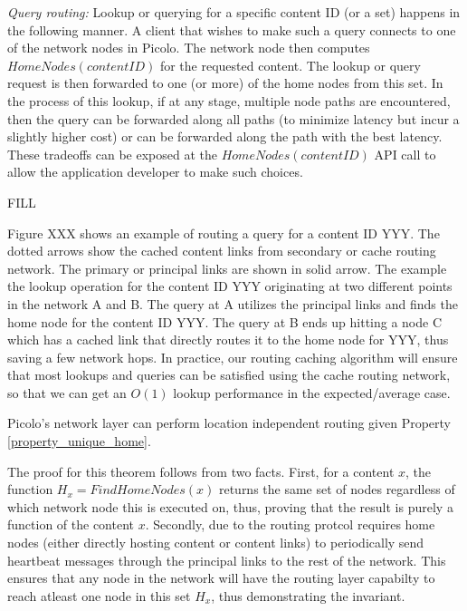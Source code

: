 {\em Query routing:} Lookup or querying for a specific content ID (or a set) happens in the following manner. A client
that wishes to make such a query connects to one of the network nodes in Picolo. The network node then computes
\(HomeNodes(contentID)\) for the requested content. The lookup or query request is then forwarded to one (or more)
of the home nodes from this set. In the process of this lookup, if at any stage, multiple node paths are encountered,
then the query can be forwarded along all paths (to minimize latency but incur a slightly higher cost) or can be
forwarded along the path with the best latency. These tradeoffs can be exposed at the \(HomeNodes(contentID)\) API
call to allow the application developer to make such choices.

FILL

Figure XXX shows an example of routing a query for a content ID YYY. The dotted arrows show the cached content links from
secondary or cache routing network. The primary or principal links are shown in solid arrow. The example the lookup operation
for the content ID YYY originating at two different points in the network A and B. The query at A utilizes the principal
links and finds the home node for the content ID YYY. The query at B ends up hitting a node C which has a cached link that
directly routes it to the home node for YYY, thus saving a few network hops. In practice, our routing caching algorithm will
ensure that most lookups and queries can be satisfied using the cache routing network, so that we can get an \(O(1)\) lookup
performance in the expected/average case.

\begin{theorem}
Picolo's network layer can perform location independent routing given Property \ref{property_unique_home}.
\end{theorem}

The proof for this theorem follows from two facts. First, for a content \(x\), the function \(H_x = FindHomeNodes(x)\) returns
the same set of nodes regardless of which network node this is executed on, thus, proving that the result is purely a function
of the content \(x\). Secondly, due to the routing protcol requires home nodes (either directly hosting content or content links)
to periodically send heartbeat messages through the principal links to the rest of the network. This ensures that any node in the 
network will have the routing layer capabilty to reach atleast one node in this set \(H_x\), thus demonstrating the invariant. 

